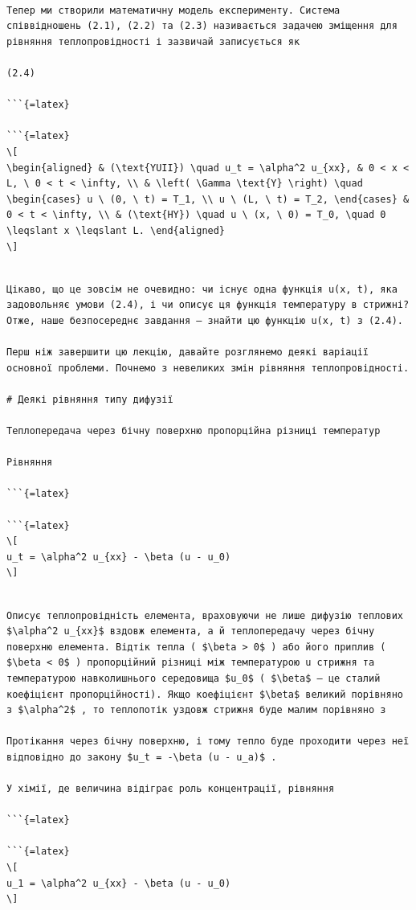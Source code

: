 \documentclass[
  ukrainian,
]{article}
\begin{document}
\begin{verbatim}

Тепер ми створили математичну модель експерименту. Система співвідношень (2.1), (2.2) та (2.3) називається задачею зміщення для рівняння теплопровідності і зазвичай записується як

(2.4)

```{=latex}

```{=latex}
\[
\begin{aligned} & (\text{YUII}) \quad u_t = \alpha^2 u_{xx}, & 0 < x < L, \ 0 < t < \infty, \\ & \left( \Gamma \text{Y} \right) \quad \begin{cases} u \ (0, \ t) = T_1, \\ u \ (L, \ t) = T_2, \end{cases} & 0 < t < \infty, \\ & (\text{HY}) \quad u \ (x, \ 0) = T_0, \quad 0 \leqslant x \leqslant L. \end{aligned}
\]
\end{verbatim}

\begin{verbatim}

Цікаво, що це зовсім не очевидно: чи існує одна функція u(x, t), яка задовольняє умови (2.4), і чи описує ця функція температуру в стрижні? Отже, наше безпосереднє завдання — знайти цю функцію u(x, t) з (2.4).

Перш ніж завершити цю лекцію, давайте розглянемо деякі варіації основної проблеми. Почнемо з невеликих змін рівняння теплопровідності.

# Деякі рівняння типу дифузії

Теплопередача через бічну поверхню пропорційна різниці температур

Рівняння

```{=latex}

```{=latex}
\[
u_t = \alpha^2 u_{xx} - \beta (u - u_0)
\]
\end{verbatim}

\begin{verbatim}

Описує теплопровідність елемента, враховуючи не лише дифузію теплових $\alpha^2 u_{xx}$ вздовж елемента, а й теплопередачу через бічну поверхню елемента. Відтік тепла ( $\beta > 0$ ) або його приплив ( $\beta < 0$ ) пропорційний різниці між температурою u стрижня та температурою навколишнього середовища $u_0$ ( $\beta$ — це сталий коефіцієнт пропорційності). Якщо коефіцієнт $\beta$ великий порівняно з $\alpha^2$ , то теплопотік уздовж стрижня буде малим порівняно з

Протікання через бічну поверхню, і тому тепло буде проходити через неї відповідно до закону $u_t = -\beta (u - u_a)$ .

У хімії, де величина відіграє роль концентрації, рівняння

```{=latex}

```{=latex}
\[
u_1 = \alpha^2 u_{xx} - \beta (u - u_0)
\]
\end{verbatim}
\end{document}
